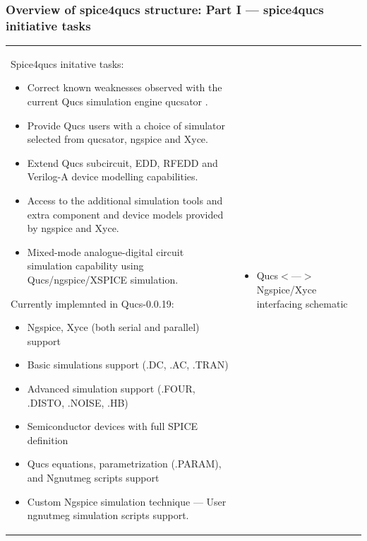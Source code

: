 \documentclass[9pt]{beamer}
\begin{document}
\begin{frame}
 \frametitle{Overview of spice4qucs structure: Part I --- spice4qucs initiative 
tasks}
 
  \begin{tabular}{p{}p{}}
  \tiny
  Spice4qucs initative tasks:
  
   \begin{itemize}
    \item Correct known weaknesses observed with the current Qucs simulation 
engine qucsator .
    \item Provide Qucs users with a choice of simulator selected from 
qucsator, ngspice and Xyce. 
    \item Extend Qucs subcircuit, EDD, RFEDD and Verilog-A device modelling 
capabilities.
    \item Access to the additional simulation tools and extra 
component and device models provided by ngspice and Xyce. 
    \item Mixed-mode analogue-digital 
circuit simulation capability using Qucs/ngspice/XSPICE simulation.
   \end{itemize}
   
   Currently implemnted in Qucs-0.0.19:
   
   \begin{itemize}
    \item Ngspice, Xyce (both serial and parallel) support
    \item Basic simulations support (.DC, .AC, .TRAN)
    \item Advanced simulation support (.FOUR, .DISTO, .NOISE, .HB)
    \item Semiconductor devices with full SPICE definition
    \item Qucs equations, parametrization (.PARAM), and Ngnutmeg scripts support
    \item Custom Ngspice simulation technique --- User ngnutmeg simulation 
    scripts support.
   \end{itemize}

  
  &    \tiny 
     \begin{itemize}
      \item  Qucs$<$---$>$Ngspice/Xyce interfacing schematic
     \end{itemize}
     

\end{tabular}
\end{frame}
\end{document}
